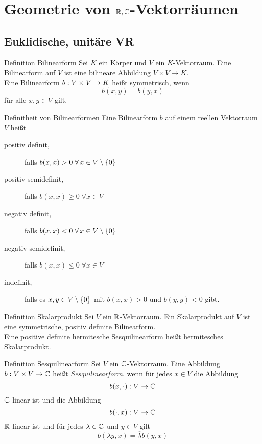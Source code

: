 \documentclass[main.tex]{subfiles}
\begin{document}
\section*{Geometrie von \(\mathbb{R}, \mathbb{C}\)-Vektorräumen}
\subsection*{Euklidische, unitäre VR}

\begin{karte}{Definition Bilinearform}
     Sei \(K\) ein Körper und \(V\) ein \(K\)-Vektorraum. Eine
     Bilinearform auf \(V\) ist eine bilineare Abbildung 
     \(V \times V \rightarrow K\).\\
     Eine Bilinearform \(b : V\times V \rightarrow K\) heißt symmetrisch,
     wenn
     \[ b(x,y) = b(y,x) \]
     für alle \(x, y \in V \) gilt.
\end{karte}

\begin{karte}{Definitheit von Bilinearformen}
     Eine Bilinearform \(b\) auf einem reellen Vektorraum \(V\) heißt
     \begin{description}
         \item[positiv definit,] falls \(b(x,x) > 0 \; \forall x \in V \setminus \set{0}\)
         \item[positiv semidefinit,] falls \(b(x,x) \geq 0 \; \forall x \in V\)
         \item[negativ definit,] falls \(b(x,x) < 0 \; \forall x \in V \setminus \set{0}\)
         \item[negativ semidefinit,] falls \(b(x,x) \leq 0 \; \forall x \in V\)
         \item[indefinit,] falls es \(x, y \in V \setminus \{0\}\) mit
         \(b(x,x) > 0\) und \(b(y,y) < 0\) gibt.  
     \end{description}
\end{karte}

\begin{karte}{Definition Skalarprodukt}
    Sei \(V\) ein \(\mathbb{R}\)-Vektorraum. Ein Skalarprodukt auf \(V\) ist eine
    symmetrische, positiv definite Bilinearform.\\
    Eine positive definite hermitesche Sesquilinearform heißt hermitesches Skalarprodukt.
\end{karte}

\begin{karte}{Definition Sesquilinearform}
    Sei \(V\) ein \(\mathbb{C}\)-Vektorraum. Eine Abbildung \(b : V\times V \rightarrow \mathbb{C}\)
    heißt \textit{Sesquilinearform}, wenn für jedes \(x\in V\) die Abbildung
    \[ b(x, \cdot) : V \rightarrow \mathbb{C} \]
    \(\mathbb{C}\)-linear ist und die Abbildung
    \[ b(\cdot, x) : V \rightarrow \mathbb{C} \]
    \(\mathbb{R}\)-linear ist und für jedes \(\lambda \in \mathbb{C}\) und \(y \in V\) gilt
    \[ b(\lambda y, x) = \overline{\lambda} b(y,x) \]
\end{karte}
\end{document}
